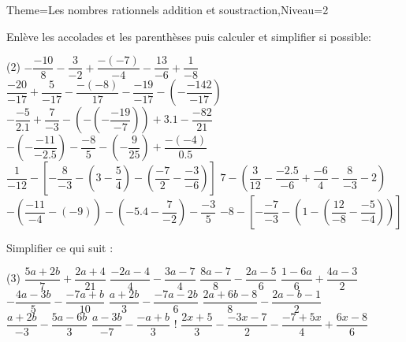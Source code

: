 \documentclass[a4paper,12pt]{article}
\begin{document}
\begin{Maquette}[Fiche]{Theme=Les nombres rationnels addition et soustraction,Niveau=2}
\begin{exercice}
Enlève les accolades et les parenthèses puis calculer et simplifier si possible:
\begin{tasks}(2)
\task $-\dfrac{-10}{8}-\dfrac{3}{-2}+\dfrac{-(-7)}{-4}-\dfrac{13}{-6}+\dfrac{1}{-8} $
\task $\dfrac{-20}{-17}+\dfrac{5}{-17}-\dfrac{-(-8)}{17}-\dfrac{-19}{-17}-\left(-\dfrac{-142}{-17}\right) $
\task $-\dfrac{-5}{2.1}+\dfrac{7}{-3}-\left(-\left(-\dfrac{-19}{-7}\right)\right)+3.1-\dfrac{-82}{21} $
\task $-\left(-\dfrac{-11}{-2.5}\right)-\dfrac{-8}{5}-\left(-\dfrac{9}{25}\right)+\dfrac{-(-4)}{0.5} $
\task $\dfrac{1}{-12}-\left[-\dfrac{8}{-3}-\left(3-\dfrac{5}{4}\right)-\left(\dfrac{-7}{2}-\dfrac{-3}{-6}\right)\right] $
\task $7-\left(\dfrac{3}{12}-\dfrac{-2.5}{-6}+\dfrac{-6}{4}-\dfrac{8}{-3}-2\right) $
\task $-\left(\dfrac{-11}{-4}-\left(-9\right)\right)-\left(-5.4-\dfrac{7}{-2}\right)-\dfrac{-3}{5} $
\task $-8-\left[-\dfrac{-7}{-3}-\left(1-\left(\dfrac{12}{-8}-\dfrac{-5}{-4}\right)\right)\right] $
\end{tasks}
\end{exercice}

\begin{exercice}
Simplifier ce qui suit :
\begin{tasks}(3)
\task $\dfrac{5a+2b}{7}+\dfrac{2a+4}{21}$
\task $\dfrac{-2a-4}{4}-\dfrac{3a-7}{4} $
\task $\dfrac{8a-7}{8}-\dfrac{2a-5}{6}$
\task $\dfrac{1-6a}{6}+\dfrac{4a-3}{2} $
\task $-\dfrac{4a-3b}{5}-\dfrac{-7a+b}{10}$
\task $\dfrac{a+2b}{3}-\dfrac{-7a-2b}{6} $
\task $\dfrac{2a+6b-8}{8}-\dfrac{2a-b-1}{2}$
\task $\dfrac{a+2b}{-3}-\dfrac{5a-6b}{3} $
\task $\dfrac{a-3b}{-7}-\dfrac{-a+b}{3}$
\task! $\dfrac{2x+5}{3}-\dfrac{-3x-7}{2}-\dfrac{-7+5x}{4}+\dfrac{6x-8}{6} $
\end{tasks}
\end{exercice}






\end{Maquette}
\end{document}
